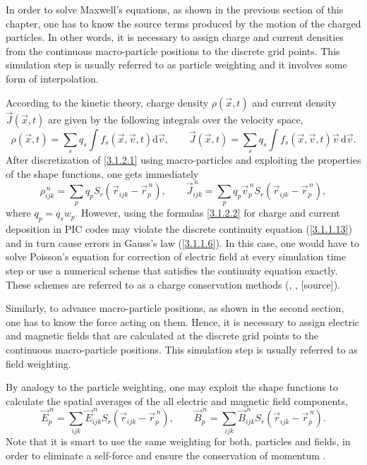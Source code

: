 In order to solve Maxwell's equations, as shown in the previous section of this chapter, one has to know the source terms produced by the motion of the charged particles. In other words, it is necessary to assign charge and current densities from the continuous macro-particle positions to the discrete grid points. This simulation step is usually referred to as particle weighting and it involves some form of interpolation.
 
According to the kinetic theory, charge density $ \rho\left(\vec{x}, t \right) $ and current density $ \vec{J}\left(\vec{x}, t \right) $ are given by the following integrals over the velocity space,
\begin{equation}
\label{3.1.2.1}
\rho\left(\vec{x}, t \right) = \sum_s q_s \int f_s \left(\vec{x}, \vec{v}, t \right) \mathrm{d} \vec{v}, \qquad \vec{J}\left(\vec{x}, t \right) = \sum_s q_s \int f_s \left(\vec{x}, \vec{v}, t \right) \vec{v} \, \mathrm{d} \vec{v}.
\end{equation}
After discretization of \ref{3.1.2.1} using macro-particles and exploiting the properties of the shape functions, one gets immediately
\begin{equation}
\label{3.1.2.2}
\rho_{ijk}^{\,n} = \sum_{p} q_p S_{r}\left(\vec{r}_{ijk} - \vec{r}_{p}^{\,n}\right), \qquad \vec{J}_{ijk}^{\,n} = \sum_{p} q_p \vec{v}_p^{\,n} S_{r}\left(\vec{r}_{ijk} - \vec{r}_{p}^{\,n}\right),
\end{equation}
where $ q_p = q_s w_p $. However, using the formulas \ref{3.1.2.2} for charge and current deposition in PIC codes may violate the discrete continuity equation (\ref{3.1.1.13}) and in turn cause errors in Gauss's law (\ref{3.1.1.6}). In this case, one would have to solve Poisson's equation for correction of electric field at every simulation time step or use a numerical scheme that satisfies the continuity equation exactly. These schemes are referred to as a charge conservation methods (\cite{villasenor}, \cite{esirkepov}, [source]).

Similarly, to advance macro-particle positions, as shown in the second section, one has to know the force acting on them. Hence, it is necessary to assign electric and magnetic fields that are calculated at the discrete grid points to the continuous macro-particle positions. This simulation step is usually referred to as field weighting.

By analogy to the particle weighting, one may exploit the shape functions to calculate the spatial averages of the all electric and magnetic field components,
\begin{equation}
\vec{E}_{p}^{\,n} = \sum_{ijk} \vec{E}_{ijk}^{\,n} S_{r}\left(\vec{r}_{ijk} - \vec{r}_{p}^{\,n}\right), \qquad \vec{B}_{p}^{\,n} = \sum_{ijk} \vec{B}_{ijk}^{\,n} S_{r}\left(\vec{r}_{ijk} - \vec{r}_{p}^{\,n}\right).
\end{equation}
Note that it is smart to use the same weighting for both, particles and fields, in order to eliminate a self-force and ensure the conservation of momentum \cite{fehske}.


